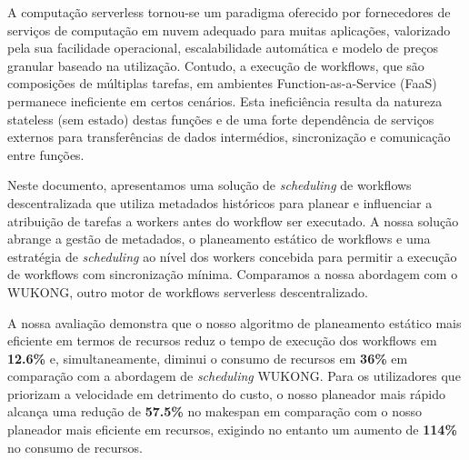 \acresetall
\noindent
A computação serverless tornou-se um paradigma oferecido por fornecedores de serviços de computação em nuvem adequado para muitas aplicações, valorizado pela sua facilidade operacional, escalabilidade automática e modelo de preços granular baseado na utilização. Contudo, a execução de workflows, que são composições de múltiplas tarefas, em ambientes Function-as-a-Service (FaaS) permanece ineficiente em certos cenários. Esta ineficiência resulta da natureza stateless (sem estado) destas funções e de uma forte dependência de serviços externos para transferências de dados intermédios, sincronização e comunicação entre funções.

Neste documento, apresentamos uma solução de \textit{scheduling} de workflows descentralizada que utiliza metadados históricos para planear e influenciar a atribuição de tarefas a workers antes do workflow ser executado. A nossa solução abrange a gestão de metadados, o planeamento estático de workflows e uma estratégia de \textit{scheduling} ao nível dos workers concebida para permitir a execução de workflows com sincronização mínima. Comparamos a nossa abordagem com o WUKONG, outro motor de workflows serverless descentralizado.

A nossa avaliação demonstra que o nosso algoritmo de planeamento estático mais eficiente em termos de recursos reduz o tempo de execução dos workflows em \textbf{12.6\%} e, simultaneamente, diminui o consumo de recursos em \textbf{36\%} em comparação com a abordagem de \textit{scheduling} WUKONG. Para os utilizadores que priorizam a velocidade em detrimento do custo, o nosso planeador mais rápido alcança uma redução de \textbf{57.5\%} no makespan em comparação com o nosso planeador mais eficiente em recursos, exigindo no entanto um aumento de \textbf{114\%} no consumo de recursos.